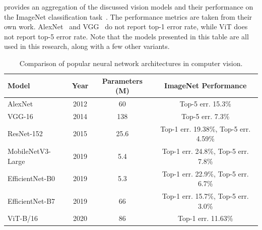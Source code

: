  provides an aggregation of the discussed vision models and their performance on the ImageNet classification task~\cite{deng_imagenet_2009}. The performance metrics are taken from their own work. AlexNet~\cite{krizhevsky_imagenet_2012} and VGG~\cite{simonyan_very_2015} do not report top-1 error rate, while \gls{ViT} does not report top-5 error rate. Note that the models presented in this table are all used in this research, along with a few other variants.

\begin{table}[ht]
\centering
\caption{Comparison of popular neural network architectures in computer vision.}
\label{tab:modelos_cnn}
\begin{tabular}{lccc}
\toprule
\textbf{Model} & \textbf{Year} & \textbf{Parameters (M)} & \textbf{ImageNet Performance} \\
\midrule
AlexNet & 2012 & 60 & Top-5 err. 15.3\% \\
VGG-16 & 2014 & 138 & Top-5 err. 7.3\% \\
ResNet-152 & 2015 & 25.6 & Top-1 err. 19.38\%, Top-5 err. 4.59\% \\
MobileNetV3-Large & 2019 & 5.4 & Top-1 err. 24.8\%, Top-5 err. 7.8\% \\
EfficientNet-B0 & 2019 & 5.3 & Top-1 err. 22.9\%, Top-5 err. 6.7\% \\
EfficientNet-B7 & 2019 & 66 & Top-1 err. 15.7\%, Top-5 err. 3.0\% \\
ViT-B/16 & 2020 & 86 & Top-1 err. 11.63\% \\
\bottomrule
\end{tabular}
\end{table}

